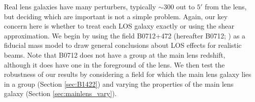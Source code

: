 Real lens galaxies have many perturbers, typically $\sim 300$ out to $5'$ from the lens, but deciding which are important is not a simple problem. Again, our key concern here is whether to treat each LOS galaxy exactly or using the shear approximation. We begin by using the field B0712+472 (hereafter B0712; \citealt{Jackson98}) as a fiducial mass model to draw general conclusions about LOS effects for realistic beams. Note that B0712 does not have a group at the main lens redshift, although it does have one in the foreground of the lens. We then test the robustness of our results by considering a field for which the main lens galaxy lies in a group (Section \ref{sec:B1422}) and varying the properties of the main lens galaxy (Section \ref{sec:mainlens_vary}).
  